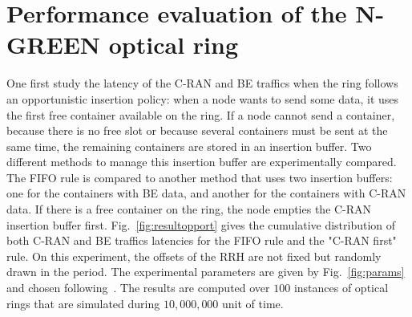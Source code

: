 \documentclass[]{algotel}
\begin{document}
% 
% 
%   

  
   \section{Performance evaluation of the N-GREEN optical ring}
   \label{sec:oportmethods}
   
   
   
  One first study the latency of the C-RAN and BE traffics when the ring follows an opportunistic insertion policy: when a node wants to send some data, it uses the first free container available on the ring. 
  If a node cannot send a container, because there is no free slot or because several containers must be sent at the same time, the remaining containers are stored in an insertion buffer. Two different methods to manage this insertion buffer are experimentally compared. The FIFO rule is compared to another method that uses two insertion buffers: one for the containers with BE data, and another for the containers with C-RAN data. If there is a free container on the ring, the node empties the C-RAN insertion buffer first.  Fig.~\ref{fig:resultopport} gives the cumulative distribution of both C-RAN and BE traffics latencies for the FIFO rule and the "C-RAN first" rule. On this experiment, the offsets of the RRH are not fixed but randomly drawn in the period. The experimental parameters are given by Fig.~\ref{fig:params} and chosen following~\cite{ngreenarchitecture}. The results are computed over $100$ instances of optical rings that are simulated during $10,000,000$ unit of time.
  
\end{document}
